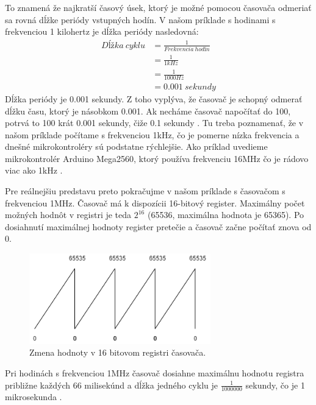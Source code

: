 To znamená že najkratší časový úsek, ktorý je možné pomocou časovača odmeriať sa
rovná dĺžke periódy vstupných hodín. V našom príklade s hodinami s frekvenciou 1 kilohertz je dĺžka periódy nasledovná:
\begin{equation}
    \begin{aligned}
        Dĺžka\:cyklu & = \frac{1}{Frekvencia\:hodín} \\
                     & = \frac{1}{1kHz}              \\
                     & = \frac{1}{ 1000 Hz}          \\
                     & =  0.001\:sekundy
    \end{aligned}
\end{equation}
Dĺžka periódy je 0.001 sekundy. Z toho vyplýva, že časovač je schopný odmerať dĺžku času, ktorý je násobkom 0.001. Ak necháme časovač napočítať do 100, potrvá to 100 krát 0.001 sekundy, čiže 0.1 sekundy \cite{cameraNewbieGuideAVR2015}.
Tu treba poznamenať, že v našom príklade počítame s frekvenciou 1kHz, čo je pomerne nízka frekvencia a dnešné mikrokontroléry sú podstatne rýchlejšie.
Ako príklad uvedieme mikrokontrolér Arduino Mega2560, ktorý používa frekvenciu 16MHz čo je rádovo viac ako 1kHz \cite{ArduinoMega2560}.
\par Pre reálnejšiu predstavu preto pokračujme v našom príklade s časovačom s frekvenciou 1MHz. Časovač má k dispozícii 16-bitový register. Maximálny počet
možných hodnôt v registri je teda $2^{16}$ (65536, maximálna hodnota je 65365).
Po dosiahnutí maximálnej hodnoty register pretečie a časovač začne počítať znova od 0.
\begin{figure}[!h]
    \centering
    \includegraphics[width=0.70\textwidth]{img/timer.png}
    \caption{Zmena hodnoty v 16 bitovom registri časovača.}
    \label{figure:timer1}
\end{figure}

Pri hodinách s frekvenciou 1MHz časovač dosiahne maximálnu hodnotu registra približne každých 66 milisekúnd a dĺžka jedného cyklu je $\frac{1}{1000000}$ sekundy, čo je 1 mikrosekunda \cite{cameraNewbieGuideAVR2015}.

